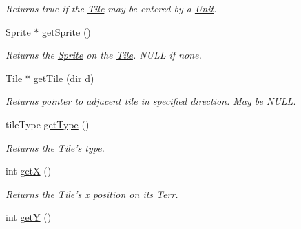 \begin{DoxyCompactItemize}
\begin{DoxyCompactList}\small\item\em Returns true if the \hyperlink{class_tile}{Tile} may be entered by a \hyperlink{class_unit}{Unit}. \end{DoxyCompactList}\item 
\hyperlink{class_sprite}{Sprite} $\ast$ \hyperlink{class_tile_a42f98bf8592783e96f42d6889a8d7e4f}{get\+Sprite} ()\hypertarget{class_tile_a42f98bf8592783e96f42d6889a8d7e4f}{}\label{class_tile_a42f98bf8592783e96f42d6889a8d7e4f}

\begin{DoxyCompactList}\small\item\em Returns the \hyperlink{class_sprite}{Sprite} on the \hyperlink{class_tile}{Tile}. N\+U\+LL if none. \end{DoxyCompactList}\item 
\hyperlink{class_tile}{Tile} $\ast$ \hyperlink{class_tile_ae5038e62f2a4c28150f6abb4deb31433}{get\+Tile} (dir d)\hypertarget{class_tile_ae5038e62f2a4c28150f6abb4deb31433}{}\label{class_tile_ae5038e62f2a4c28150f6abb4deb31433}

\begin{DoxyCompactList}\small\item\em Returns pointer to adjacent tile in specified direction. May be N\+U\+LL. \end{DoxyCompactList}\item 
tile\+Type \hyperlink{class_tile_a36871de25627c7483c31807da1c28706}{get\+Type} ()\hypertarget{class_tile_a36871de25627c7483c31807da1c28706}{}\label{class_tile_a36871de25627c7483c31807da1c28706}

\begin{DoxyCompactList}\small\item\em Returns the Tile’s type. \end{DoxyCompactList}\item 
int \hyperlink{class_tile_a25b90e07fd9cdaba1df3ac2a9b6d032b}{getX} ()\hypertarget{class_tile_a25b90e07fd9cdaba1df3ac2a9b6d032b}{}\label{class_tile_a25b90e07fd9cdaba1df3ac2a9b6d032b}

\begin{DoxyCompactList}\small\item\em Returns the Tile’s x position on its \hyperlink{class_terr}{Terr}. \end{DoxyCompactList}\item 
int \hyperlink{class_tile_acf97bff4aac74cc8d7e09bc8ca5afa68}{getY} ()\hypertarget{class_tile_acf97bff4aac74cc8d7e09bc8ca5afa68}{}\label{class_tile_acf97bff4aac74cc8d7e09bc8ca5afa68}


\end{DoxyCompactItemize}
